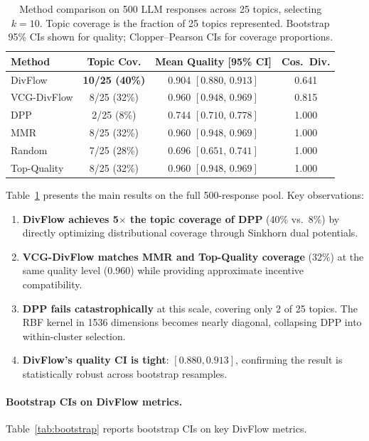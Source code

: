\documentclass[10pt]{article}
\begin{document}
\begin{table}[t]
\centering
\caption{Method comparison on 500 LLM responses across 25 topics, selecting $k{=}10$.
Topic coverage is the fraction of 25 topics represented.
Bootstrap 95\% CIs shown for quality; Clopper--Pearson CIs for coverage proportions.}
\label{tab:main}
\small
\begin{tabular}{lccc}
\toprule
\textbf{Method} & \textbf{Topic Cov.} & \textbf{Mean Quality [95\% CI]} & \textbf{Cos.\ Div.} \\
\midrule
DivFlow      & \textbf{10/25 (40\%)} & 0.904\; $[0.880,\, 0.913]$ & 0.641 \\
VCG-DivFlow  & 8/25 (32\%) & 0.960\; $[0.948,\, 0.969]$ & 0.815 \\
DPP          & 2/25 (8\%)  & 0.744\; $[0.710,\, 0.778]$ & 1.000 \\
MMR          & 8/25 (32\%) & 0.960\; $[0.948,\, 0.969]$ & 1.000 \\
Random       & 7/25 (28\%) & 0.696\; $[0.651,\, 0.741]$ & 1.000 \\
Top-Quality  & 8/25 (32\%) & 0.960\; $[0.948,\, 0.969]$ & 1.000 \\
\bottomrule
\end{tabular}
\end{table}

Table~\ref{tab:main} presents the main results on the full 500-response pool.
Key observations:

\begin{enumerate}[leftmargin=*,itemsep=2pt]
  \item \textbf{DivFlow achieves 5$\times$ the topic coverage of DPP} (40\% vs.\ 8\%) by directly optimizing distributional coverage through Sinkhorn dual potentials.
  \item \textbf{VCG-DivFlow matches MMR and Top-Quality coverage} (32\%) at the same quality level (0.960) while providing approximate incentive compatibility.
  \item \textbf{DPP fails catastrophically} at this scale, covering only 2 of 25 topics. The RBF kernel in 1536 dimensions becomes nearly diagonal, collapsing DPP into within-cluster selection.
  \item \textbf{DivFlow's quality CI is tight}: $[0.880, 0.913]$, confirming the result is statistically robust across bootstrap resamples.
\end{enumerate}

\paragraph{Bootstrap CIs on DivFlow metrics.}
Table~\ref{tab:bootstrap} reports bootstrap CIs on key DivFlow metrics.
\end{document}
